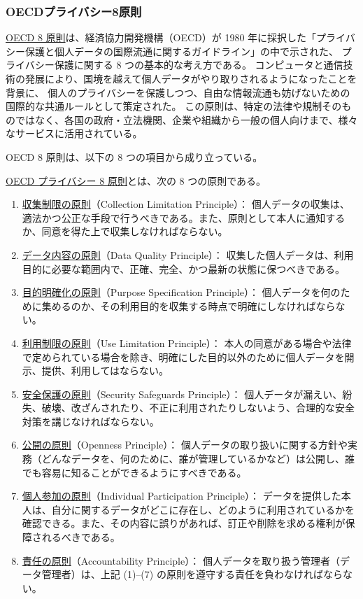 \documentclass[uplatex]{jsarticle}
\def\label#1{}%
\begin{document}
\subsubsection{OECDプライバシー8原則}

\underline{OECD 8 原則}は、経済協力開発機構（OECD）が 1980 年に採択した「プライバシー保護と個人データの国際流通に関するガイドライン」の中で示された、
プライバシー保護に関する 8 つの基本的な考え方である。
コンピュータと通信技術の発展により、国境を越えて個人データがやり取りされるようになったことを背景に、
個人のプライバシーを保護しつつ、自由な情報流通も妨げないための国際的な共通ルールとして策定された。
この原則は、特定の法律や規制そのものではなく、各国の政府・立法機関、企業や組織から一般の個人向けまで、様々なサービスに活用されている。

OECD 8 原則は、以下の 8 つの項目から成り立っている。

\begin{dfn}\label{dfn:oecd-principles}
\underline{OECD プライバシー 8 原則}とは、次の 8 つの原則である。
\begin{enumerate}
\item \underline{収集制限の原則}（Collection Limitation Principle）：
個人データの収集は、適法かつ公正な手段で行うべきである。また、原則として本人に通知するか、同意を得た上で収集しなければならない。
\item \underline{データ内容の原則}（Data Quality Principle）：
収集した個人データは、利用目的に必要な範囲内で、正確、完全、かつ最新の状態に保つべきである。
\item \underline{目的明確化の原則}（Purpose Specification Principle）：
個人データを何のために集めるのか、その利用目的を収集する時点で明確にしなければならない。
\item \underline{利用制限の原則}（Use Limitation Principle）：
本人の同意がある場合や法律で定められている場合を除き、明確にした目的以外のために個人データを開示、提供、利用してはならない。
\item \underline{安全保護の原則}（Security Safeguards Principle）：
個人データが漏えい、紛失、破壊、改ざんされたり、不正に利用されたりしないよう、合理的な安全対策を講じなければならない。
\item \underline{公開の原則}（Openness Principle）：
個人データの取り扱いに関する方針や実務（どんなデータを、何のために、誰が管理しているかなど）は公開し、誰でも容易に知ることができるようにすべきである。
\item \underline{個人参加の原則}（Individual Participation Principle）：
データを提供した本人は、自分に関するデータがどこに存在し、どのように利用されているかを確認できる。また、その内容に誤りがあれば、訂正や削除を求める権利が保障されるべきである。
\item \underline{責任の原則}（Accountability Principle）：
個人データを取り扱う管理者（データ管理者）は、上記 (1)--(7) の原則を遵守する責任を負わなければならない。
\end{enumerate}
\end{dfn}
\end{document}
